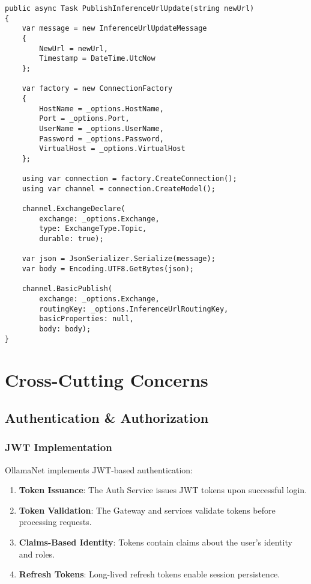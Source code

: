 \begin{verbatim}
public async Task PublishInferenceUrlUpdate(string newUrl)
{
    var message = new InferenceUrlUpdateMessage
    {
        NewUrl = newUrl,
        Timestamp = DateTime.UtcNow
    };
    
    var factory = new ConnectionFactory
    {
        HostName = _options.HostName,
        Port = _options.Port,
        UserName = _options.UserName,
        Password = _options.Password,
        VirtualHost = _options.VirtualHost
    };
    
    using var connection = factory.CreateConnection();
    using var channel = connection.CreateModel();
    
    channel.ExchangeDeclare(
        exchange: _options.Exchange,
        type: ExchangeType.Topic,
        durable: true);
        
    var json = JsonSerializer.Serialize(message);
    var body = Encoding.UTF8.GetBytes(json);
    
    channel.BasicPublish(
        exchange: _options.Exchange,
        routingKey: _options.InferenceUrlRoutingKey,
        basicProperties: null,
        body: body);
}
\end{verbatim}

\section{Cross-Cutting Concerns}

\subsection{Authentication \& Authorization}

\subsubsection{JWT Implementation}

OllamaNet implements JWT-based authentication:

\begin{enumerate}
   \item \textbf{Token Issuance}: The Auth Service issues JWT tokens upon successful login.
   \item \textbf{Token Validation}: The Gateway and services validate tokens before processing requests.
   \item \textbf{Claims-Based Identity}: Tokens contain claims about the user's identity and roles.
   \item \textbf{Refresh Tokens}: Long-lived refresh tokens enable session persistence.
\end{enumerate}

